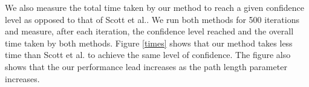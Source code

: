 \documentclass{ws-procs11x85}
\begin{document}
\begin{figure}[h]
{}
\end{figure}

We also measure the total time taken by our method to reach a given confidence
level as opposed to that of Scott et al.\cite{scott}. We run both methods for
500 iterations and measure, after each iteration, the confidence level reached
and the overall time taken by both methods. Figure \ref{times} shows that our
method takes less time than Scott et al. to achieve the same level of
confidence. The figure also shows that the our performance lead increases as
the path length parameter increases.
\end{document}
